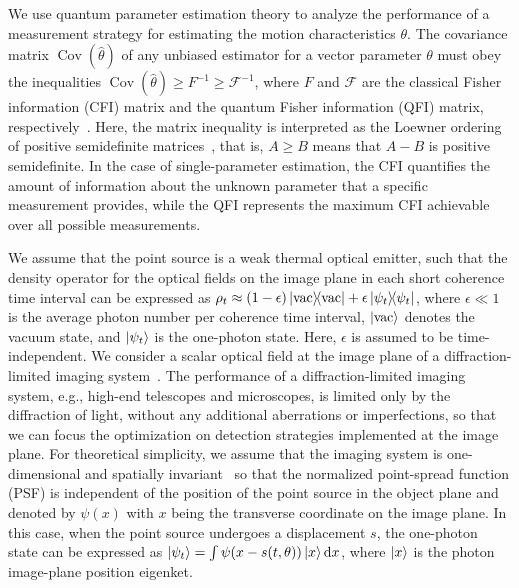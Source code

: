 \documentclass[aps,pra,10pt,showpacs,amsmath,amssymb,floatfix,superscriptaddress,twocolumn]{revtex4-2}
\begin{document}
We use quantum parameter estimation theory to analyze the performance of a measurement strategy for estimating the motion characteristics \( \theta \).
The covariance matrix \(\operatorname{Cov}(\hat\theta)\) of any unbiased estimator for a vector parameter \( \theta \) must obey the inequalities \( \operatorname{Cov}(\hat\theta) \geq F^{-1} \geq \mathcal{F}^{-1} \), where \( F \) and \( \mathcal{F} \) are the classical Fisher information (CFI) matrix and the quantum Fisher information (QFI) matrix, respectively~\cite{Helstrom1967,Helstrom1968,Helstrom1976,Liu2020,Paris2009}.
Here, the matrix inequality is interpreted as the Loewner ordering of positive semidefinite matrices~\cite{Horn2012,Bhatia1997}, that is, \( A\geq B \) means that \( A-B \) is positive semidefinite.
In the case of single-parameter estimation, the CFI quantifies the amount of information about the unknown parameter that a specific measurement provides, while the QFI represents the maximum CFI achievable over all possible measurements.


We assume that the point source is a weak thermal optical emitter, such that the density operator for the optical fields on the image plane in each short coherence time interval can be expressed as \( \rho_t \approx (1-\epsilon) \op{\mathrm{vac}} + \epsilon \op{\psi_t} \), where \( \epsilon \ll 1 \) is the average photon number per coherence time interval, \( \ket{\mathrm{vac}} \) denotes the vacuum state, and \( \ket{\psi_t} \) is the one-photon state.
Here, \(\epsilon\) is assumed to be time-independent.
We consider a scalar optical field at the image plane of a diffraction-limited imaging system~\cite[Sec.~6.1]{Goodman2003}. 
The performance of a diffraction-limited imaging system, e.g., high-end telescopes and microscopes, is limited only by the diffraction of light, without any additional aberrations or imperfections, so that we can focus the optimization on detection strategies implemented at the image plane.
For theoretical simplicity, we assume that the imaging system is one-dimensional and spatially invariant~\cite[Sec.~2.3]{Goodman2003} so that the normalized point-spread function (PSF) is independent of the position of the point source in the object plane and denoted by \(\psi(x)\) with \(x\) being the transverse coordinate on the image plane.
In this case, when the point source undergoes a displacement \( s \), the one-photon state can be expressed as \( \ket{\psi_t} = \int \psi(x-s(t,\theta)) \ket{x} \dd{x}\), where \(\ket{x}\) is the photon image-plane position eigenket.
\end{document}
